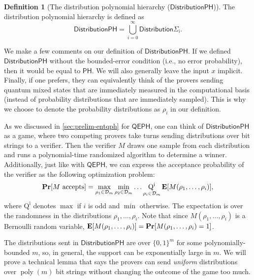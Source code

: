 \documentclass[10pt,a4paper]{article}
\theoremstyle{definition}
\newtheorem{definition}[theorem]{Definition}
\renewcommand{\Pr}{\mathop{\bf Pr\/}}
\newcommand{\E}{\mathop{\bf E\/}}
\DeclareMathOperator{\poly}{poly}
\newcommand{\class}[1]{\ensuremath{\mathsf{#1}}\xspace}
\newcommand{\PH}{\class{PH}}
\newcommand{\QEPH}{\class{QEPH}}
\newcommand{\distributionPH}{\mixedPH}
\newcommand{\mixedPH}{\class{DistributionPH}}
\newcommand{\mixedSigmai}[1][i]{\mathsf{Distribution\Sigma_{#1}}}
\newcommand{\calD}{\mathcal{D}}
\begin{document}
\begin{definition}[The distribution polynomial hierarchy ($\distributionPH$)]\label{def:mixedPH}
    The distribution polynomial hierarchy is defined as 
    \[\mixedPH = \bigcup_{i = 0}^{\infty} \mixedSigmai[i].\]
\end{definition}


We make a few comments on our definition of $\distributionPH$.
If we defined $\mixedPH$ without the bounded-error condition (i.e., no error probability), then it would be equal to $\PH$. We will also generally leave the input $x$ implicit.
Finally, if one prefers, they can equivalently think of the provers sending quantum mixed states that are immediately measured in the computational basis (instead of probability distributions that are immediately sampled). This is why we choose to denote the probability distributions as $\rho_i$ in our definition. 

As we discussed in \cref{sec:prelim-entqph} for $\QEPH$, one can think of $\mixedPH$ as a game, where two competing provers take turns sending distributions over bit strings to a verifier. Then the verifier $M$ draws one sample from each distribution and runs a polynomial-time randomized algorithm to determine a winner.
Additionally, just like with $\QEPH$, we can express the acceptance probability of the verifier as the following optimization problem:
\[
\Pr[M \text{ accepts}] = \max_{\rho_1 \in \calD_m} \min_{\rho_2 \in \calD_m} \ldots \operatorname*{Q^i}_{\rho_i \in \calD_m} \E[M(\rho_1, \ldots, \rho_i)],
\]
where
$\operatorname*{Q^i}$ denotes $\max$ if $i$ is odd and $\min$ otherwise. 
The expectation is over the randomness in the distributions $\rho_1, \ldots, \rho_i$. Note that since $M(\rho_1, \ldots, \rho_i)$ is a Bernoulli random variable, $\E[M(\rho_1, \ldots, \rho_i)] = \Pr[M(\rho_1, \ldots, \rho_i) = 1]$.

The distributions sent in $\mixedPH$ are over $\{0,1\}^m$ for some polynomially-bounded $m$, so, in general, the support can be exponentially large in $m$. 
We will prove a technical lemma that says the provers can send \emph{uniform} distributions over $\poly(m)$ bit strings without changing the outcome of the game too much. 
\end{document}
